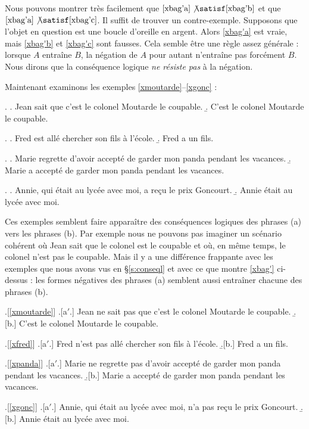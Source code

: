 \begin{refsegment}
Nous pouvons montrer très facilement que \(\text{\ref{xbag'a}}
\not\satisf  \text{\ref{xbag'b}}\) et que \(\text{\ref{xbag'a}}
\not\satisf \text{\ref{xbag'c}}\).  Il suffit de trouver un
contre-exemple.  Supposons que l'objet en question est
une boucle d'oreille en argent.  Alors \ref{xbag'a} est vraie,
mais \ref{xbag'b} et \ref{xbag'c} sont fausses.
Cela semble être une règle assez générale : lorsque $A$ entraîne
$B$, la négation de $A$ pour autant n'entraîne pas forcément $B$.
Nous dirons que la conséquence
logique \emph{ne résiste pas} à la négation.


Maintenant examinons les exemples \ref{xmoutarde}--\ref{xgonc} :

\ex.\label{xmoutarde}
\a. Jean sait que c'est le colonel Moutarde le coupable.
\b. C'est le colonel Moutarde le coupable.

\ex.\label{xfred}
\a. Fred est allé chercher son fils à l'école. \label{xfreda}
\b. Fred a un fils. \label{xfredb}

\ex.\label{xpanda}
\a. Marie regrette d'avoir accepté de garder mon panda pendant les
vacances.
\b. Marie a accepté de garder mon panda pendant les
vacances.

\ex.\label{xgonc}
\a. Annie, qui était au lycée avec moi, a reçu le prix Goncourt.
\b. Annie était au lycée avec moi.


\largerpage[-1]

Ces exemples semblent faire apparaître des conséquences logiques  des
phrases (a) vers les phrases (b).  
Par exemple nous ne pouvons pas imaginer un scénario cohérent où Jean sait que le colonel est le coupable et où, en même temps, le colonel n'est pas le coupable.
Mais il y 
a une différence frappante avec les exemples que nous avons vus en \S\ref{s:conseql} et avec ce que montre \ref{xbag'} ci-dessus : les formes négatives des phrases (a) semblent aussi entraîner chacune des phrases (b).\label{p.resNeg}

\ex.[\ref{xmoutarde}]
\a.[a$'$.] Jean ne sait pas que c'est le colonel Moutarde le coupable.
\b.[b.] C'est le colonel Moutarde le coupable.

\ex.[\ref{xfred}]
\a.[a$'$.] Fred n'est pas allé chercher son fils à l'école.
\b.[b.] Fred a un fils.

\ex.[\ref{xpanda}]
\a.[a$'$.] Marie ne regrette pas d'avoir accepté de garder mon panda
  pendant les vacances.
\b.[b.] Marie a accepté de garder mon panda pendant les
vacances.

\ex.[\ref{xgonc}]
\a.[a$'$.] Annie, qui était au lycée avec moi, n'a pas reçu le prix Goncourt.
\b.[b.] Annie était au lycée avec moi.



\end{refsegment}
